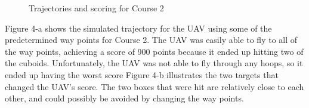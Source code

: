 \documentclass[12pt]{article}
\begin{document}
\begin{figure}[H]
	\caption{Trajectories and scoring for Course 2}
\end{figure}
Figure 4-a shows the simulated trajectory for the UAV using some of the predetermined way points for Course 2. The UAV was easily able to fly to all of the way points, achieving a score of 900 points because it ended up hitting two of the cuboids. Unfortunately, the UAV was not able to fly through any hoops, so it ended up having the worst score  Figure 4-b illustrates the two targets that changed the UAV's score. The two boxes that were hit are relatively close to each other, and could possibly be avoided by changing the way points. 
\end{document}
